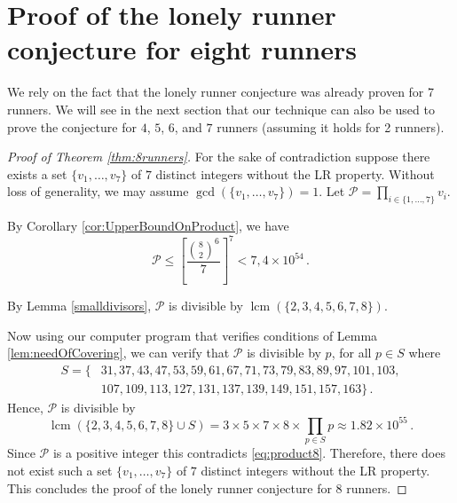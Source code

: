 \documentclass[11pt,a4paper]{article}
\theoremstyle{definition}
\theoremstyle{remark}
\DeclareMathOperator{\lcm}{lcm}
\begin{document}
\section{Proof of the lonely runner conjecture for eight runners}
We rely on the fact that the lonely runner conjecture was already proven for 7 runners. We will see in the next section that our technique can also be used to prove the conjecture for $4$, $5$, $6$, and $7$ runners (assuming it holds for 2 runners).
\begin{proof}[Proof of Theorem \ref{thm:8runners}]
For the sake of contradiction suppose there exists a set $\{v_1,\ldots,v_7\}$ of $7$ distinct integers without the LR property. Without loss of generality, we may assume  $\gcd(\{v_1,\ldots,v_7\})=1$.
Let $\mathcal{P}=\prod_{i\in\{1,\ldots,7\}}v_i$.

By Corollary \ref{cor:UpperBoundOnProduct}, we have
\begin{equation}\label{eq:product8}
\mathcal{P} \le \left[\frac{\binom{8}{2}^{6}}{7}\right]^7 < 7,4\times 10^{54}\,.
\end{equation}

By Lemma \ref{smalldivisors}, $\mathcal{P}$ is divisible by $\lcm(\{2,3,4,5,6,7,8\})$.

Now using our computer program that verifies conditions of Lemma \ref{lem:needOfCovering}, we can verify that $\mathcal{P}$ is divisible by $p$, for all $p\in S$ where
 \begin{align*}
S=\{&31,37,43,47,53,59,61,67,71,73,79,83,89,97,101,103,\\
 &107,109,113,127,131,137,139,149,151,157,163\}\,.
 \end{align*}
 Hence, $\mathcal{P}$ is divisible by 
\[
 \lcm(\{2,3,4,5,6,7,8\}\cup S)=3\times5\times7\times8\times \prod_{p\in S}p\approx 1.82\times 10^{55}\,.
\]
Since $\mathcal{P}$ is a positive integer this contradicts \eqref{eq:product8}. Therefore, there does not exist such a set $\{v_1,\ldots,v_7\}$ of $7$ distinct integers without the LR property. This concludes the proof of the lonely runner conjecture for 8 runners.
\end{proof}
\end{document}
